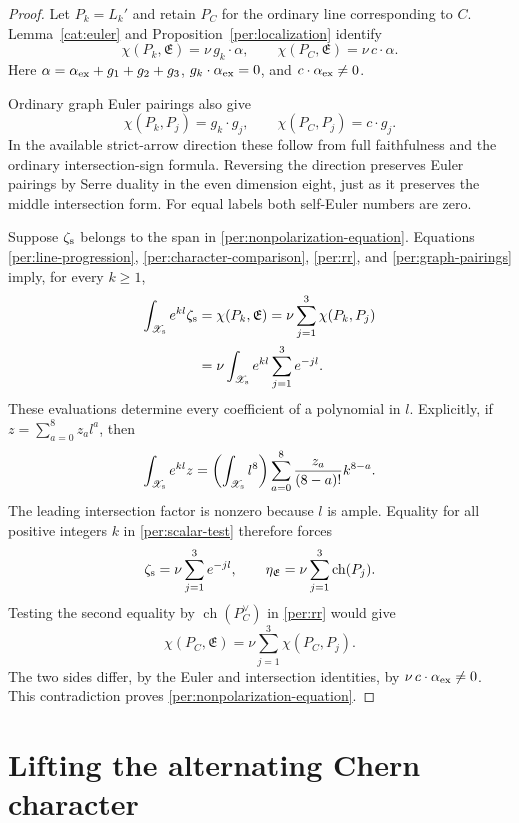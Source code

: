 \documentclass[11pt]{article}
\theoremstyle{definition}
\theoremstyle{remark}
\DeclareMathOperator{\ch}{ch}
\numberwithin{equation}{section}
\begin{document}
\begin{proof}
Let $P_k=L_k'$ and retain $P_C$ for the ordinary line corresponding
to $C$.  Lemma~\ref{cat:euler} and
Proposition~\ref{per:localization} identify
\[
 \chi(P_k,\mathfrak E)=\nu\,g_k\cdot\alpha,
 \qquad
 \chi(P_C,\mathfrak E)=\nu\,c\cdot\alpha.
\]
Here $\alpha=\alpha_{\rm ex}+g_1+g_2+g_3$,
$g_k\cdot\alpha_{\rm ex}=0$, and
$c\cdot\alpha_{\rm ex}\ne0$.

Ordinary graph Euler pairings also give
\begin{equation}
 \chi(P_k,P_j)=g_k\cdot g_j,
 \qquad
 \chi(P_C,P_j)=c\cdot g_j.
 \label{per:graph-pairings}
\end{equation}
In the available strict-arrow direction these follow from full
faithfulness and the ordinary intersection-sign formula.  Reversing
the direction preserves Euler pairings by Serre duality in the even
dimension eight, just as it preserves the middle intersection form.
For equal labels both self-Euler numbers are zero.

Suppose $\zeta_{\rm s}$ belongs to the span in
\eqref{per:nonpolarization-equation}.  Equations
\eqref{per:line-progression}, \eqref{per:character-comparison},
\eqref{per:rr}, and \eqref{per:graph-pairings} imply, for every
$k\ge1$,
\begin{align}
 \int_{\mathscr X_{\rm s}}e^{kl}\zeta_{\rm s}
   &=\chi(P_k,\mathfrak E)
     =\nu\sum_{j=1}^3\chi(P_k,P_j)\notag\\
   &=\nu\int_{\mathscr X_{\rm s}}
                         e^{kl}\sum_{j=1}^3e^{-jl}.
 \label{per:scalar-test}
\end{align}
These evaluations determine every coefficient of a polynomial in
$l$.  Explicitly, if $z=\sum_{a=0}^8z_al^a$, then
\[
 \int_{\mathscr X_{\rm s}}e^{kl}z
    =\left(\int_{\mathscr X_{\rm s}}l^8\right)
       \sum_{a=0}^8\frac{z_a}{(8-a)!}k^{8-a}.
\]
The leading intersection factor is nonzero because $l$ is ample.
Equality for all positive integers $k$ in \eqref{per:scalar-test}
therefore forces
\[
 \zeta_{\rm s}=\nu\sum_{j=1}^3e^{-jl},
 \qquad
 \eta_{\mathfrak E}=\nu\sum_{j=1}^3\ch(P_j).
\]
Testing the second equality by $\ch(P_C^\vee)$ in
\eqref{per:rr} would give
\[
 \chi(P_C,\mathfrak E)=\nu\sum_{j=1}^3\chi(P_C,P_j).
\]
The two sides differ, by the Euler and intersection identities,
by $\nu\,c\cdot\alpha_{\rm ex}\ne0$.  This contradiction proves
\eqref{per:nonpolarization-equation}.
\end{proof}

\section{Lifting the alternating Chern character}
\label{lift:section}
\end{document}

